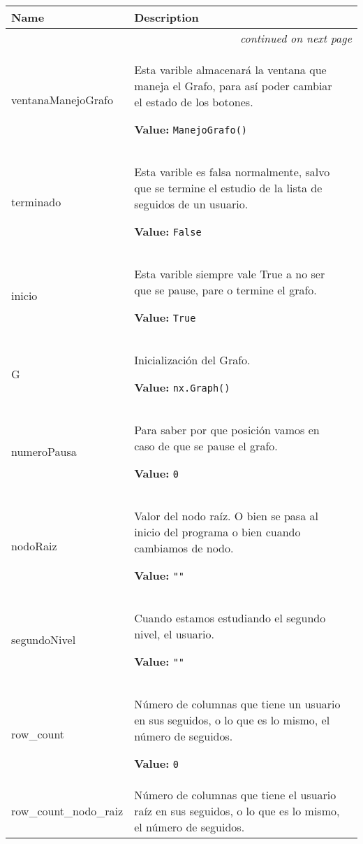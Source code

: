     \vspace{-1cm}
\hspace{\varindent}\begin{longtable}{|p{\varnamewidth}|p{\vardescrwidth}|l}
\cline{1-2}
\cline{1-2} \centering \textbf{Name} & \centering \textbf{Description}& \\
\cline{1-2}
\endhead\cline{1-2}\multicolumn{3}{r}{\small\textit{continued on next page}}\\\endfoot\cline{1-2}
\endlastfoot\raggedright v\-e\-n\-t\-a\-n\-a\-M\-a\-n\-e\-j\-o\-G\-r\-a\-f\-o\- & \raggedright Esta varible almacenará la ventana que maneja el Grafo, para así 
          poder cambiar el estado de los botones.

\textbf{Value:} 
{\tt ManejoGrafo()}&\\
\cline{1-2}
\raggedright t\-e\-r\-m\-i\-n\-a\-d\-o\- & \raggedright Esta varible es falsa normalmente, salvo que se termine el 
          estudio de la lista de seguidos de un usuario.

\textbf{Value:} 
{\tt False}&\\
\cline{1-2}
\raggedright i\-n\-i\-c\-i\-o\- & \raggedright Esta varible siempre vale True a no ser que se pause, pare o 
          termine el grafo.

\textbf{Value:} 
{\tt True}&\\
\cline{1-2}
\raggedright G\- & \raggedright Inicialización del Grafo.

\textbf{Value:} 
{\tt nx.Graph()}&\\
\cline{1-2}
\raggedright n\-u\-m\-e\-r\-o\-P\-a\-u\-s\-a\- & \raggedright Para saber por que posición vamos en caso de que se pause el 
          grafo.

\textbf{Value:} 
{\tt 0}&\\
\cline{1-2}
\raggedright n\-o\-d\-o\-R\-a\-i\-z\- & \raggedright Valor del nodo raíz. O bien se pasa al inicio del programa o bien
          cuando cambiamos de nodo.

\textbf{Value:} 
{\tt ""}&\\
\cline{1-2}
\raggedright s\-e\-g\-u\-n\-d\-o\-N\-i\-v\-e\-l\- & \raggedright Cuando estamos estudiando el segundo nivel, el usuario.

\textbf{Value:} 
{\tt ""}&\\
\cline{1-2}
\raggedright r\-o\-w\-\_\-c\-o\-u\-n\-t\- & \raggedright Número de columnas que tiene un usuario en sus seguidos, o lo que
          es lo mismo, el número de seguidos.

\textbf{Value:} 
{\tt 0}&\\
\cline{1-2}
\raggedright r\-o\-w\-\_\-c\-o\-u\-n\-t\-\_\-n\-o\-d\-o\-\_\-r\-a\-i\-z\- & \raggedright Número de columnas que tiene el usuario raíz en sus seguidos, o 
          lo que es lo mismo, el número de seguidos.


\end{longtable}
